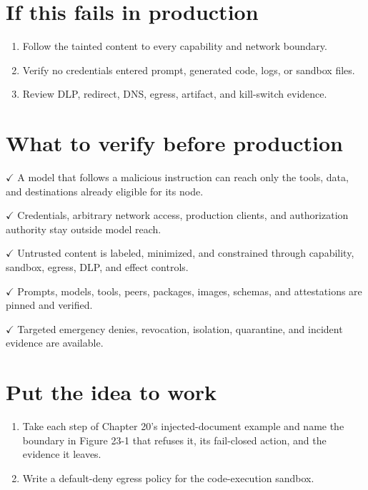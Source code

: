 \section{If this fails in production}

\begin{enumerate}

\item Follow the tainted content to every capability and network boundary.

\item Verify no credentials entered prompt, generated code, logs, or sandbox files.

\item Review DLP, redirect, DNS, egress, artifact, and kill-switch evidence.

\end{enumerate}

\section{What to verify before production}

\textbf{\ensuremath{\checkmark}} A model that follows a malicious instruction can reach only the tools, data, and destinations already eligible for its node.\par

\textbf{\ensuremath{\checkmark}} Credentials, arbitrary network access, production clients, and authorization authority stay outside model reach.\par

\textbf{\ensuremath{\checkmark}} Untrusted content is labeled, minimized, and constrained through capability, sandbox, egress, DLP, and effect controls.\par

\textbf{\ensuremath{\checkmark}} Prompts, models, tools, peers, packages, images, schemas, and attestations are pinned and verified.\par

\textbf{\ensuremath{\checkmark}} Targeted emergency denies, revocation, isolation, quarantine, and incident evidence are available.\par

\section{Put the idea to work}

\begin{enumerate}

\item Take each step of Chapter 20's injected-document example and name the boundary in Figure 23-1 that refuses it, its fail-closed action, and the evidence it leaves.

\item Write a default-deny egress policy for the code-execution sandbox.

\end{enumerate}

